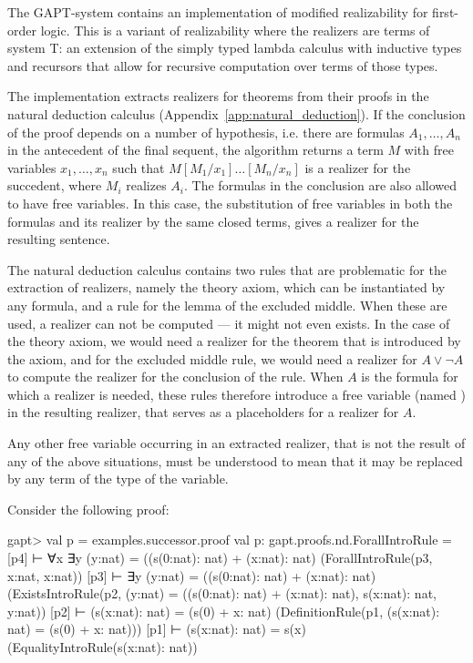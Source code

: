\documentclass[a4paper,11pt]{book}
\renewcommand{\lor}{\vee}
\newcommand{\cli}[1]{{\ttfamily {#1}}}
\begin{document}
The GAPT-system contains an implementation of modified realizability for first-order logic. This is a variant of realizability where the realizers are terms of system T: an extension of the simply typed lambda calculus with inductive types and recursors that allow for recursive computation over terms of those types.

The implementation extracts realizers for theorems from their proofs in the natural deduction calculus (Appendix~\ref{app:natural_deduction}). If the conclusion of the proof depends on a number of hypothesis, i.e. there are formulas $A_1,\dots,A_n$ in the antecedent of the final sequent, the algorithm returns a term $M$ with free variables  $x_1,\dots,x_n$ such that $M[M_1/x_1]\dots[M_n/x_n]$ is a realizer for the succedent, where $M_i$ realizes $A_i$. The formulas in the conclusion are also allowed to have free variables. In this case, the substitution of free variables in both the formulas and its realizer by the same closed terms, gives a realizer for the resulting sentence.

The natural deduction calculus contains two rules that are problematic for the extraction of realizers, namely the theory axiom, which can be instantiated by any formula, and a rule for the lemma of the excluded middle. When these are used, a realizer can not be computed --- it might not even exists. In the case of the theory axiom, we would need a realizer for the theorem that is introduced by the axiom, and for the excluded middle rule, we would need a realizer for $A \lor \neg A$ to compute the realizer for the conclusion of the rule. When $A$ is the formula for which a realizer is needed, these rules therefore introduce a free variable (named \cli{mrealizer(A)}) in the resulting realizer, that serves as a placeholders for a realizer for $A$.

Any other free variable occurring in an extracted realizer, that is not the result of any of the above situations, must be understood to mean that it may be replaced by any term of the type of the variable.

Consider the following proof:

\begin{clilisting}
  gapt> val p = examples.successor.proof
  val p: gapt.proofs.nd.ForallIntroRule = [p4]  ⊢ ∀x ∃y (y:nat) = ((s(0:nat): nat) + (x:nat): nat)    (ForallIntroRule(p3, x:nat, x:nat))
  [p3]  ⊢ ∃y (y:nat) = ((s(0:nat): nat) + (x:nat): nat)    (ExistsIntroRule(p2, (y:nat) = ((s(0:nat): nat) + (x:nat): nat), s(x:nat): nat, y:nat))
  [p2]  ⊢ (s(x:nat): nat) = (s(0) + x: nat)    (DefinitionRule(p1, (s(x:nat): nat) = (s(0) + x: nat)))
  [p1]  ⊢ (s(x:nat): nat) = s(x)    (EqualityIntroRule(s(x:nat): nat))

\end{clilisting}
\end{document}
